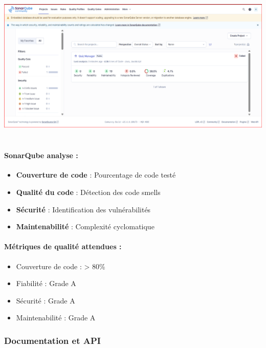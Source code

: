 \documentclass[12pt,a4paper,twoside,openright]{report}
\begin{document}
\includegraphics[width=6.15694in,height=2.94861in]{latex_media/media/image43.png}

\hypertarget{sonarqube-analyse}{%
\paragraph{SonarQube analyse :}\label{sonarqube-analyse}}

\begin{itemize}
\item
  \textbf{Couverture de code} : Pourcentage de code testé
\item
  \textbf{Qualité du code} : Détection des code smells
\item
  \textbf{Sécurité} : Identification des vulnérabilités
\item
  \textbf{Maintenabilité} : Complexité cyclomatique
\end{itemize}

\hypertarget{muxe9triques-de-qualituxe9-attendues}{%
\paragraph{Métriques de qualité attendues
:}\label{muxe9triques-de-qualituxe9-attendues}}

\begin{itemize}
\item
  Couverture de code : \textgreater{} 80\%
\item
  Fiabilité : Grade A
\item
  Sécurité : Grade A
\item
  Maintenabilité : Grade A
\end{itemize}

\hypertarget{documentation-et-api}{%
\subsubsection{Documentation et API}\label{documentation-et-api}}
\end{document}
